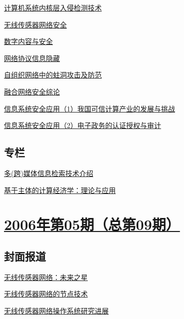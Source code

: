 \documentclass[a4paper]{article}
\begin{document}
\href{http://history.ccf.org.cn/resources/1190201776262/2010/04/15/010027.pdf}{计算机系统内核层入侵检测技术}

\href{http://history.ccf.org.cn/resources/1190201776262/2010/04/15/010034.pdf}{无线传感器网络安全}

\href{http://history.ccf.org.cn/resources/1190201776262/2010/04/15/010043.pdf}{数字内容与安全}

\href{http://history.ccf.org.cn/resources/1190201776262/2010/04/15/010048.pdf}{网络协议信息隐藏}

\href{http://history.ccf.org.cn/resources/1190201776262/2010/04/15/010055.pdf}{自组织网络中的蛀洞攻击及防范}

\href{http://history.ccf.org.cn/resources/1190201776262/2010/04/15/010060.pdf}{融合网络安全综论}

\href{http://history.ccf.org.cn/resources/1190201776262/2010/04/15/010066.pdf}{信息系统安全应用（1）我国可信计算产业的发展与挑战}

\href{http://history.ccf.org.cn/resources/1190201776262/2010/04/15/010068.pdf}{信息系统安全应用（2）电子政务的认证授权与审计}

\subsection{专栏}
\href{http://history.ccf.org.cn/resources/1190201776262/2010/04/15/010070.pdf}{多(跨)媒体信息检索技术介绍}

\href{http://history.ccf.org.cn/resources/1190201776262/2010/04/15/010079.pdf}{基于主体的计算经济学：理论与应用}


\section{\href{http://history.ccf.org.cn/sites/ccf/jsjtbbd.jsp?contentId=2542567628944}{\textbf{2006年第05期（总第09期）}}}

\subsection{封面报道}
\href{http://history.ccf.org.cn/resources/1190201776262/2010/04/15/009016.pdf}{无线传感器网络：未来之星}

\href{http://history.ccf.org.cn/resources/1190201776262/2010/04/15/009017.pdf}{无线传感器网络的节点技术}

\href{http://history.ccf.org.cn/resources/1190201776262/2010/04/15/009025.pdf}{无线传感器网络操作系统研究进展}
\end{document}
